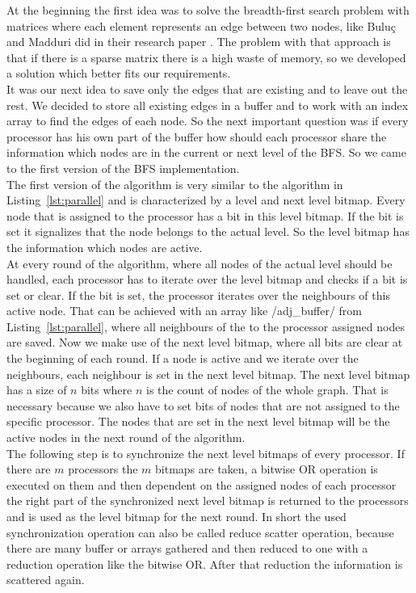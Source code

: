 \documentclass[12pt,a4paper]{article}
\begin{document}
At the beginning the first idea was to solve the breadth-first search problem with matrices where each element represents an edge between two nodes, like Buluç and Madduri did in their research paper \cite{matrices}. The problem with that approach is that if there is a sparse matrix there is a high waste of memory, so we developed a solution which better fits our requirements.\\
It was our next idea to save only the edges that are existing and to leave out the rest. We decided to store all existing edges in a buffer and to work with an index array to find the edges of each node. So the next important question was if every processor has his own part of the buffer how should each processor share the information which nodes are in the current or next level of the BFS. So we came to the first version of the BFS implementation.\\
The first version of the algorithm is very similar to the algorithm in Listing~\ref{lst:parallel} and is characterized by a level and next level bitmap. Every node that is assigned to the processor has a bit in this level bitmap. If the bit is set it signalizes that the node belongs to the actual level. So the level bitmap has the information which nodes are active.\\
At every round of the algorithm, where all nodes of the actual level should be handled, each processor has to iterate over the level bitmap and checks if a bit is set or clear. If the bit is set, the processor iterates over the neighbours of this active node. That can be achieved with an array like \cinline/adj_buffer/ from Listing~\ref{lst:parallel}, where all neighbours of the to the processor assigned nodes are saved. Now we make use of the next level bitmap, where all bits are clear at the beginning of each round. If a node is active and we iterate over the neighbours, each neighbour is set in the next level bitmap. The next level bitmap has a size of \(n\) bits where \(n\) is the count of nodes of the whole graph. That is necessary because we also have to set bits of nodes that are not assigned to the specific processor. The nodes that are set in the next level bitmap will be the active nodes in the next round of the algorithm.\\
The following step is to synchronize the next level bitmaps of every processor. If there are \(m\) processors the \(m\) bitmaps are taken, a bitwise OR operation is executed on them and then dependent on the assigned nodes of each processor the right part of the synchronized next level bitmap is returned to the processors and is used as the level bitmap for the next round. In short the used synchronization operation can also be called reduce scatter operation, because there are many buffer or arrays gathered and then reduced to one with a reduction operation like the bitwise OR. After that reduction the information is scattered again.\\
\end{document}
